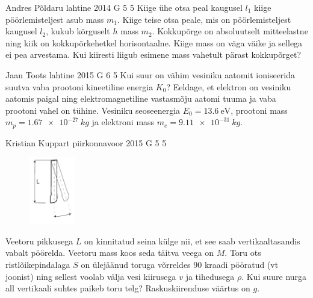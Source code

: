 \documentclass[11pt, twoside]{article}
\begin{document}
{%
{Andres Põldaru} %
{lahtine} %
{2014} %
{G 5} %
{5} %
{
\ifStatement
Kiige ühe otsa peal kaugusel $l_1$ kiige pöörlemisteljest asub mass $m_1$. Kiige teise otsa peale, mis on pöörlemisteljest kaugusel $l_2$, kukub kõrguselt $h$ mass $m_2$. Kokkupõrge on absoluutselt mitteelastne ning kiik on kokkupõrkehetkel horisontaalne. Kiige mass on väga väike ja sellega ei pea arvestama. Kui kiiresti liigub esimene mass vahetult pärast kokkupõrget?
\fi
}

{Jaan Toots} %
{lahtine} %
{2015} %
{G 6} %
{5} %
{
\ifStatement
Kui suur on vähim vesiniku aatomit ioniseerida suutva vaba prootoni kineetiline energia $K_0$? Eeldage, et elektron on vesiniku aatomis paigal ning elektromagnetiline vastasmõju aatomi tuuma ja vaba prootoni vahel on tühine. Vesiniku seoseenergia $E_0 = \SI{13.6}{\electronvolt}$, prootoni mass $m_p=\SI{1.67e-27}{kg}$ ja elektroni mass $m_e=\SI{9.11e-31}{kg}$.
\fi
}

{Kristian Kuppart} %
{piirkonnavoor} %
{2015} %
{G 5} %
{5} %
{
\ifStatement
\begin{figure}
  \vspace{-30pt}
  \begin{center}
    \includegraphics[width=0.18\textwidth]{2015-v2g-05-toru}
  \end{center}
\end{figure}
Veetoru pikkusega $L$ on kinnitatud seina külge nii, et see saab vertikaaltasandis vabalt pöörelda. Veetoru mass koos seda täitva veega on $M$. Toru ots ristlõikepindalaga $S$ on ülejäänud toruga võrreldes \num{90} kraadi pööratud (vt joonist) ning sellest voolab välja vesi kiirusega $v$ ja tihedusega $\rho$. Kui suure nurga all vertikaali suhtes paikeb toru telg? Raskuskiirenduse väärtus on $g$.
\pagebreak
\fi
}

}
\end{document}

